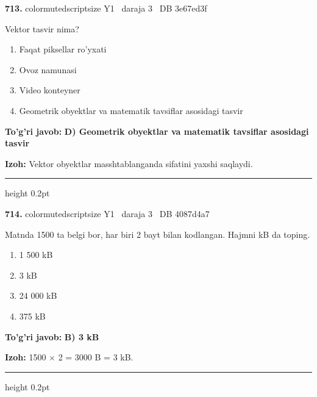 \documentclass[10pt,a4paper,oneside]{article}
\begin{document}
\noindent\textbf{\color{ink}713.}  {color{muted}scriptsize Y1 \textbullet\ daraja 3 \textbullet\ DB 3e67ed3f}
\par
Vektor tasvir nima?
\begin{enumerate}[label=\Alph*),leftmargin=9mm]
\item Faqat piksellar ro'yxati
\item Ovoz namunasi
\item Video konteyner
\item Geometrik obyektlar va matematik tavsiflar asosidagi tasvir
\end{enumerate}
\begin{tcolorbox}[enhanced,breakable,colback=teal!4,colframe=teal!50!black,boxrule=0.5pt,arc=1.1mm,left=3mm,right=3mm,top=1.7mm,bottom=1.7mm,before skip=2mm,after skip=2mm]
\textbf{\color{teal}To'g'ri javob:} \textbf{D) Geometrik obyektlar va matematik tavsiflar asosidagi tasvir}
\par\smallskip
\textbf{Izoh:} Vektor obyektlar masshtablanganda sifatini yaxshi saqlaydi.
\end{tcolorbox}
\vspace{2mm}\hrule height 0.2pt \vspace{3mm}

\noindent\textbf{\color{ink}714.}  {color{muted}scriptsize Y1 \textbullet\ daraja 3 \textbullet\ DB 4087d4a7}
\par
Matnda 1500 ta belgi bor, har biri 2 bayt bilan kodlangan. Hajmni kB da toping.
\begin{enumerate}[label=\Alph*),leftmargin=9mm]
\item 1 500 kB
\item 3 kB
\item 24 000 kB
\item 375 kB
\end{enumerate}
\begin{tcolorbox}[enhanced,breakable,colback=teal!4,colframe=teal!50!black,boxrule=0.5pt,arc=1.1mm,left=3mm,right=3mm,top=1.7mm,bottom=1.7mm,before skip=2mm,after skip=2mm]
\textbf{\color{teal}To'g'ri javob:} \textbf{B) 3 kB}
\par\smallskip
\textbf{Izoh:} 1500 \ensuremath{\times} 2 = 3000 B = 3 kB.
\end{tcolorbox}
\vspace{2mm}\hrule height 0.2pt \vspace{3mm}
\end{document}
